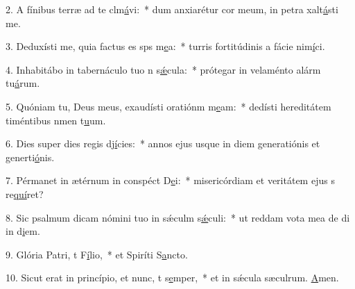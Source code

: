 2. A fínibus terræ ad te clm\uline{á}vi:~* dum anxiarétur cor meum, in petra xalt\uline{á}sti me.\par 
3. Deduxísti me, quia factus es sps m\uline{e}a:~* turris fortitúdinis a fácie nim\uline{í}ci.\par 
4. Inhabitábo in tabernáculo tuo n s\uline{ǽ}cula:~* prótegar in velaménto alárm tu\uline{á}rum.\par 
5. Quóniam tu, Deus meus, exaudísti oratiónm m\uline{e}am:~* dedísti hereditátem timéntibus nmen t\uline{u}um.\par 
6. Dies super dies regis dj\uline{í}cies:~* annos ejus usque in diem generatiónis et generti\uline{ó}nis.\par 
7. Pérmanet in ætérnum in conspéct D\uline{e}i:~* misericórdiam et veritátem ejus s re\uline{quí}ret?\par 
8. Sic psalmum dicam nómini tuo in sǽculm s\uline{ǽ}culi:~* ut reddam vota mea de di in d\uline{i}em.\par 
9. Glória Patri, t F\uline{í}lio,~* et Spiríti S\uline{a}ncto.\par 
10. Sicut erat in princípio, et nunc, t s\uline{e}mper,~* et in sǽcula sæculrum. \uline{A}men.\par 
